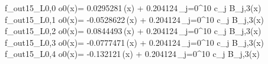 f_{out15_L0,0	o0}(x)= 0.0295281\,\phi(x) + 0.204124\,\sum_{j=0}^{10} c_j B_{j,3}(x)
f_{out15_L0,1	o0}(x)= -0.0528622\,\phi(x) + 0.204124\,\sum_{j=0}^{10} c_j B_{j,3}(x)
f_{out15_L0,2	o0}(x)= 0.0844493\,\phi(x) + 0.204124\,\sum_{j=0}^{10} c_j B_{j,3}(x)
f_{out15_L0,3	o0}(x)= -0.0777471\,\phi(x) + 0.204124\,\sum_{j=0}^{10} c_j B_{j,3}(x)
f_{out15_L0,4	o0}(x)= -0.132121\,\phi(x) + 0.204124\,\sum_{j=0}^{10} c_j B_{j,3}(x)
